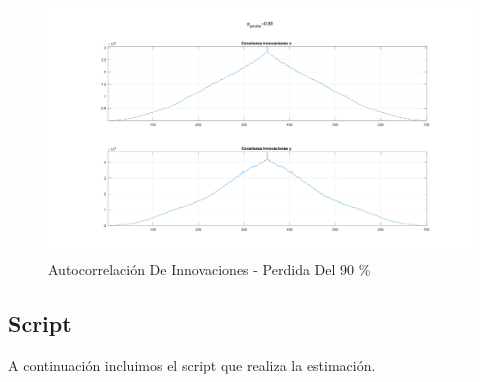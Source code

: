 	\begin{figure}[H]
		\centering
		\includegraphics[width=1.0\textwidth,keepaspectratio]{Figuras/covinn_ej7_2.pdf}
		\caption{Autocorrelación De Innovaciones - Perdida Del 90 \%}
		\label{fig:ej7_1_inov}
	\end{figure}
	
	\subsection{Script}

	A continuación incluimos el script que realiza la estimación.
	
